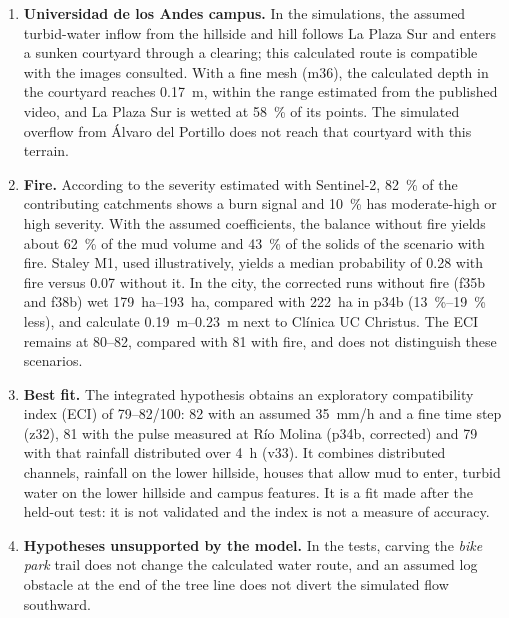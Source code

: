\begin{enumerate}
\item \textbf{Universidad de los Andes campus.} In the simulations, the assumed turbid-water inflow from the hillside and hill follows La Plaza Sur and enters a sunken courtyard through a clearing; this calculated route is compatible with the images consulted. With a fine mesh (m36), the calculated depth in the courtyard reaches \SI{0.17}{m}, within the range estimated from the published video, and La Plaza Sur is wetted at \SI{58}{\percent} of its points. The simulated overflow from Álvaro del Portillo does not reach that courtyard with this terrain.
\item \textbf{Fire.} According to the severity estimated with Sentinel-2, \SI{82}{\percent} of the contributing catchments shows a burn signal and \SI{10}{\percent} has moderate-high or high severity. With the assumed coefficients, the balance without fire yields about \SI{62}{\percent} of the mud volume and \SI{43}{\percent} of the solids of the scenario with fire. Staley M1, used illustratively, yields a median probability of 0.28 with fire versus 0.07 without it. In the city, the corrected runs without fire (f35b and f38b) wet \SIrange{179}{193}{ha}, compared with \SI{222}{ha} in p34b (\SIrange{13}{19}{\percent} less), and calculate \SIrange{0.19}{0.23}{m} next to Clínica UC Christus. The ECI remains at 80--82, compared with 81 with fire, and does not distinguish these scenarios.
\item \textbf{Best fit.} The integrated hypothesis obtains an exploratory compatibility index (ECI) of 79--82/100: 82 with an assumed \SI{35}{mm/h} and a fine time step (z32), 81 with the pulse measured at Río Molina (p34b, corrected) and 79 with that rainfall distributed over \SI{4}{h} (v33). It combines distributed channels, rainfall on the lower hillside, houses that allow mud to enter, turbid water on the lower hillside and campus features. It is a fit made after the held-out test: it is not validated and the index is not a measure of accuracy.
\item \textbf{Hypotheses unsupported by the model.} In the tests, carving the \emph{bike park} trail does not change the calculated water route, and an assumed log obstacle at the end of the tree line does not divert the simulated flow southward.
\end{enumerate}

